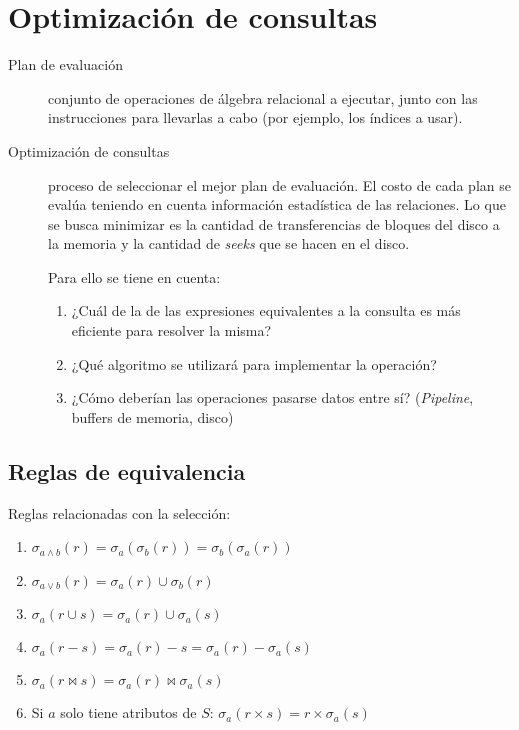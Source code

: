 \documentclass[a4paper, twoside]{article}
\newcommand{\codedir}{../resources/code} %
\begin{document}
\section{Optimización de consultas}
\begin{description}
	\item[Plan de evaluación] conjunto de operaciones de álgebra relacional a ejecutar, junto con las instrucciones para llevarlas a cabo (por ejemplo, los índices a usar).
	\item[Optimización de consultas] proceso de seleccionar el mejor plan de evaluación. El costo de cada plan se evalúa teniendo en cuenta información estadística de las relaciones. Lo que se busca minimizar es la cantidad de transferencias de bloques del disco a la memoria y la cantidad de \emph{seeks} que se hacen en el disco. 

	Para ello se tiene en cuenta:
	\begin{enumerate}
		\item ¿Cuál de la de las expresiones equivalentes a la consulta es más eficiente para resolver la misma?
		\item ¿Qué algoritmo se utilizará para implementar la operación?
		\item ¿Cómo deberían las operaciones pasarse datos entre sí? (\emph{Pipeline}, buffers de memoria, disco)
	\end{enumerate}
\end{description}


 
\subsection{Reglas de equivalencia}
Reglas relacionadas con la selección:
\begin{enumerate}
	\item $\sigma_{a\wedge b}(r)=\sigma_{a}\left(\sigma_{b}(r)\right)=\sigma_{b}\left(\sigma_{a}(r)\right)$
	\item $\sigma_{a\vee b}(r)=\sigma_{a}(r)\cup\sigma_{b}(r)$
	\item $\sigma_{a}(r\cup s)=\sigma_{a}(r)\cup\sigma_{a}(s)$
	\item $\sigma_{a}(r-s)=\sigma_{a}(r)-s=\sigma_{a}(r)-\sigma_{a}(s)$
	\item $\sigma_{a}(r\bowtie s)=\sigma_{a}(r)\bowtie\sigma_{a}(s)$
	\item Si $a$ solo tiene atributos de $S$: $\sigma_{a}(r\times s)=r\times\sigma_{a}(s)$
\end{enumerate}
\end{document}
